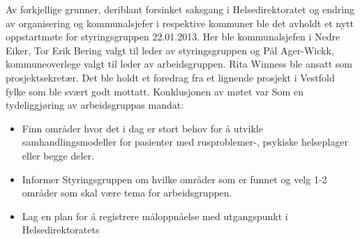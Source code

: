 \documentclass[11pt]{report} %
\begin{document}
                Av forkjellige grunner, deriblant forsinket saksgang i Helsedirektoratet og endring av organisering og kommunalsjefer i respektive kommuner ble det avholdt et nytt oppstartmøte for styringsgruppen 22.01.2013. Her ble kommunalsjefen i Nedre Eiker, Tor Erik Bering valgt til leder av styringsgruppen og Pål Ager-Wickk, kommuneoverlege valgt til leder av arbeidsgruppen. Rita Winness ble ansatt som prosjektsekretær. Det ble holdt et foredrag fra et lignende prosjekt i Vestfold fylke \cite{sporVf}som ble svært godt mottatt. 
                Konklusjonen av møtet var \cite{strgr_mref13-1}Som en tydeliggjøring av arbeidsgruppas mandat:
                  \begin{itemize}
                  \item Finn områder hvor det i dag er stort behov for å utvikle samhandlingsmodeller for pasienter med rusproblemer-, psykiske helseplager eller begge deler.\\
                  \item Informer Styringsgruppen om hvilke områder som er funnet og velg 1-2 områder som skal være tema for arbeidsgruppen.\\
                  \item Lag en plan for å registrere måloppnåelse med utgangspunkt i Helsedirektoratets \\
                  \end{itemize}
\end{document}
